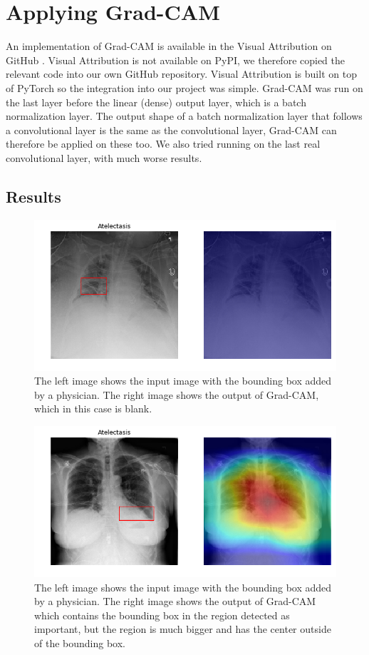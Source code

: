 \section{Applying Grad-CAM}

An implementation of Grad-CAM is available in the Visual Attribution on GitHub \cite{visualattribution}. Visual Attribution is not available on PyPI, we therefore copied the relevant code into our own GitHub repository. Visual Attribution is built on top of PyTorch so the integration into our project was simple. Grad-CAM was run on the last layer before the linear (dense) output layer, which is a batch normalization layer. The output shape of a batch normalization layer that follows a convolutional layer is the same as the convolutional layer, Grad-CAM can therefore be applied on these too. We also tried running on the last real convolutional layer, with much worse results.

\subsection{Results}
\begin{figure}[H]
\centering
\includegraphics[width=12cm]{chapters/03_classification/images/grad-cam_0.png}
\caption{The left image shows the input image with the bounding box added by a physician. The right image shows the output of Grad-CAM, which in this case is blank.}
\label{grad_cam_example_1}
\end{figure}

\begin{figure}[H]
\centering
\includegraphics[width=12cm]{chapters/03_classification/images/grad-cam_2.png}
\caption{The left image shows the input image with the bounding box added by a physician. The right image shows the output of Grad-CAM which contains the bounding box in the region detected as important, but the region is much bigger and has the center outside of the bounding box.}
\label{grad_cam_example_2}
\end{figure}

